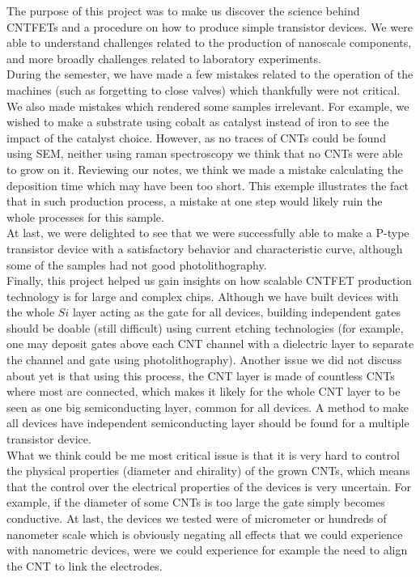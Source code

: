 \documentclass[a4paper,12pt,twoside]{article}
\begin{document}
The purpose of this project was to make us discover the science behind CNTFETs and a procedure on how to produce simple transistor devices. We were able to understand challenges related to the production of nanoscale components, and more broadly challenges related to laboratory experiments. 
\\
During the semester, we have made a few mistakes related to the operation of the machines (such as forgetting to close valves) which thankfully were not critical. We also made mistakes which rendered some samples irrelevant. For example, we wished to make a substrate using cobalt as catalyst instead of iron to see the impact of the catalyst choice. However, as no traces of CNTs could be found using SEM, neither using raman spectroscopy we think that no CNTs were able to grow on it. Reviewing our notes, we think we made a mistake calculating the deposition time which may have been too short. This exemple illustrates the fact that in such production process, a mistake at one step would likely ruin the whole processes for this sample.
\\
At last, we were delighted to see that we were successfully able to make a P-type transistor device with a satisfactory behavior and characteristic curve, although some of the samples had not good photolithography.
\\
Finally, this project helped us gain insights on how scalable CNTFET production technology is for large and complex chips. 
Although we have built devices with the whole $Si$ layer acting as the gate for all devices, building independent gates should be doable (still difficult) using current etching technologies (for example, one may deposit gates above each CNT channel with a dielectric layer to separate the channel and gate using photolithography).
Another issue we did not discuss about yet is that using this process, the CNT layer is made of countless CNTs where most are connected, which makes it likely for the whole CNT layer to be seen as one big semiconducting layer, common for all devices. A method to make all devices have independent semiconducting layer should be found for a multiple transistor device. \\

What we think could be me most critical issue is that it is very hard to control the physical properties (diameter and chirality) of the grown CNTs, which means that the control over the electrical properties of the devices is very uncertain. For example, if the diameter of some CNTs is too large the gate simply becomes conductive.
At last, the devices we tested were of micrometer or hundreds of nanometer scale which is obviously negating all effects that we could experience with nanometric devices, were we could experience for example the need to align the CNT to link the electrodes. 


\newpage


\end{document}
